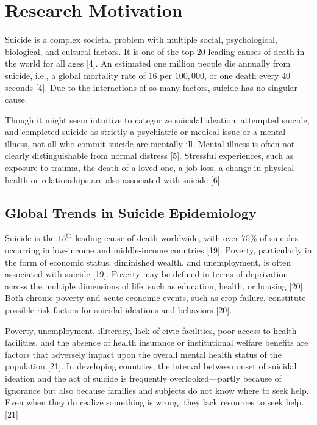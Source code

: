 \documentclass[]{article}
\begin{document}
\section{Research Motivation}\label{research-motivation}

Suicide is a complex societal problem with multiple social,
psychological, biological, and cultural factors. It is one of the top 20
leading causes of death in the world for all ages {[}4{]}. An estimated
one million people die annually from suicide, i.e., a global mortality
rate of \(16\) per \(100,000\), or one death every \(40\) seconds
{[}4{]}. Due to the interactions of so many factors, suicide has no
singular cause.

Though it might seem intuitive to categorize suicidal ideation,
attempted suicide, and completed suicide as strictly a psychiatric or
medical issue or a mental illness, not all who commit suicide are
mentally ill. Mental illness is often not clearly distinguishable from
normal distress {[}5{]}. Stressful experiences, such as exposure to
trauma, the death of a loved one, a job loss, a change in physical
health or relationships are also associated with suicide {[}6{]}.

\subsection{Global Trends in Suicide
Epidemiology}\label{global-trends-in-suicide-epidemiology}

Suicide is the \(15^{\text{th}}\) leading cause of death worldwide, with
over \(75\%\) of suicides occurring in low-income and middle-income
countries {[}19{]}. Poverty, particularly in the form of economic
status, diminished wealth, and unemployment, is often associated with
suicide {[}19{]}. Poverty may be defined in terms of deprivation across
the multiple dimensions of life, such as education, health, or housing
{[}20{]}. Both chronic poverty and acute economic events, such as crop
failure, constitute possible risk factors for suicidal ideations and
behaviors {[}20{]}.

Poverty, unemployment, illiteracy, lack of civic facilities, poor access
to health facilities, and the absence of health insurance or
institutional welfare benefits are factors that adversely impact upon
the overall mental health status of the population {[}21{]}. In
developing countries, the interval between onset of suicidal ideation
and the act of suicide is frequently overlooked---partly because of
ignorance but also because families and subjects do not know where to
seek help. Even when they do realize something is wrong, they lack
resources to seek help. {[}21{]}
\end{document}
